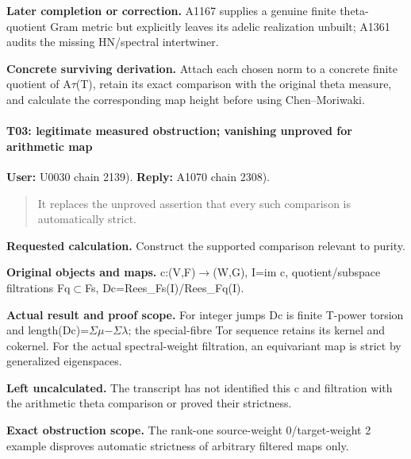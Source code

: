 \textbf{Later completion or correction.} A1167 supplies a genuine finite
theta-quotient Gram metric but explicitly leaves its adelic realization
unbuilt; A1361 audits the missing HN/spectral intertwiner.

\textbf{Concrete surviving derivation.} Attach each chosen norm to a
concrete finite quotient of
A\allowbreak{}\ensuremath{τ}\allowbreak{}(T), retain its exact
comparison with the original theta measure, and calculate the
corresponding map height before using Chen--Moriwaki.

\paragraph{T03: legitimate measured obstruction; vanishing unproved for
arithmetic
map}\label{t03-legitimate-measured-obstruction-vanishing-unproved-for-arithmetic-map}

\textbf{User:} U0030
\protect{} chain 2139).
\textbf{Reply:} A1070
\protect{} chain 2308).

\begin{quote}
It replaces the unproved assertion that every such comparison is
automatically strict.
\end{quote}

\textbf{Requested calculation.} Construct the supported comparison
relevant to purity.

\textbf{Original objects and maps.}
c:(V,F)\allowbreak{}\ensuremath{→}\allowbreak{}(W,G), I=im c,
quotient/subspace filtrations
Fq\allowbreak{}\ensuremath{⊂}\allowbreak{}Fs,
Dc=Rees\_Fs(I)/Rees\_Fq(I).

\textbf{Actual result and proof scope.} For integer jumps Dc is finite
T-power torsion and
length(Dc)=\allowbreak{}\ensuremath{Σ}\allowbreak{}\allowbreak{}\ensuremath{μ}\allowbreak{}\allowbreak{}\ensuremath{−}\allowbreak{}\allowbreak{}\ensuremath{Σ}\allowbreak{}\allowbreak{}\ensuremath{λ}\allowbreak{};
the special-fibre Tor sequence retains its kernel and cokernel. For the
actual spectral-weight filtration, an equivariant map is strict by
generalized eigenspaces.

\textbf{Left uncalculated.} The transcript has not identified this c and
filtration with the arithmetic theta comparison or proved their
strictness.

\textbf{Exact obstruction scope.} The rank-one source-weight
0/target-weight 2 example disproves automatic strictness of arbitrary
filtered maps only.

